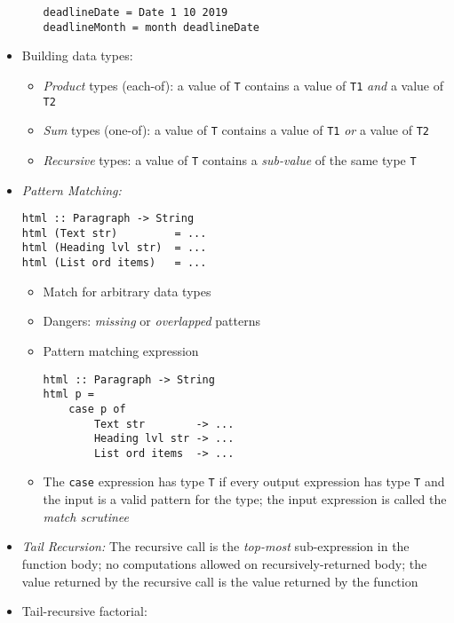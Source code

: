 \documentclass[landscape,8pt]{extarticle}
\newcommand{\code}{\lstinline}
\begin{document}
\begin{multicols}{4}
\begin{itemize}
\begin{itemize}
\begin{lstlisting}
deadlineDate = Date 1 10 2019
deadlineMonth = month deadlineDate
               \end{lstlisting}
              \end{itemize}
        \item Building data types:
              \begin{itemize}
                  \item \emph{Product} types (each-of): a value of \code{T} contains a value of \code{T1} \emph{and} a value of \code{T2}
                  \item \emph{Sum} types (one-of): a value of \code{T} contains a value of \code{T1} \emph{or} a value of \code{T2}
                  \item \emph{Recursive} types: a value of \code{T} contains a \emph{sub-value} of the same type \code{T}
              \end{itemize}
        \item \emph{Pattern Matching:}
              \begin{lstlisting}
html :: Paragraph -> String
html (Text str)         = ...
html (Heading lvl str)  = ...
html (List ord items)   = ...
\end{lstlisting}
              \begin{itemize}
                  \item Match for arbitrary data types
                  \item Dangers: \emph{missing} or \emph{overlapped} patterns
                  \item Pattern matching expression
                        \begin{lstlisting}
html :: Paragraph -> String
html p =
    case p of
        Text str        -> ...
        Heading lvl str -> ...
        List ord items  -> ...
\end{lstlisting}
                  \item The \code{case} expression has type \code{T} if every output expression has type \code{T} and the input is a valid pattern for the type; the input expression is called the \emph{match scrutinee}
              \end{itemize}
        \item \emph{Tail Recursion:} The recursive call is the \emph{top-most} sub-expression in the function body; no computations allowed on recursively-returned body; the value returned by the recursive call is the value returned by the function
        \item Tail-recursive factorial:

\end{itemize}
\end{multicols}
\end{document}
